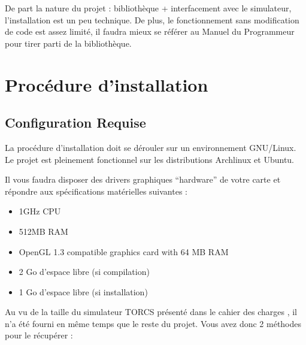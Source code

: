 \documentclass[a4paper,12pt]{article}
\begin{document}
  \begin{titlepage}
   \def\titletype{Manuel de l’utilisateur}
   
  \end{titlepage}

  
  \clearpage

  \tableofcontents
  

  \clearpage
  
  \renewcommand{\labelitemi}{$\bullet$}
  \renewcommand{\labelitemii}{$\circ$}
  \renewcommand{\labelitemiii}{$\diamond$}
  \renewcommand{\labelitemiv}{$\ast$}
  
  
  De part la nature du projet : bibliothèque + interfacement avec le simulateur, l'installation est un peu technique.
  De plus, le fonctionnement sans modification de code est assez limité, il faudra mieux se référer au 
  Manuel du Programmeur pour tirer parti de la bibliothèque.
  
  \section{Procédure d’installation}

  \subsection{Configuration Requise}
  La procédure d'installation doit se dérouler sur un environnement GNU/Linux.
  Le projet est pleinement fonctionnel sur les distributions Archlinux et Ubuntu.
 
  Il vous faudra disposer des drivers graphiques ``hardware'' de votre carte et répondre aux spécifications
  matérielles suivantes :
   \begin{itemize}
    \item 1GHz CPU
    \item 512MB RAM
    \item OpenGL 1.3 compatible graphics card with 64 MB RAM
    \item 2 Go d'espace libre (si compilation)
    \item 1 Go d'espace libre (si installation)
   \end{itemize}
 
 Au vu de la taille du simulateur TORCS \cite{TORCS} présenté
  dans le cahier des charges \cite{CdC}, il n'a été fourni en même temps que le reste du projet.
 Vous avez donc 2 méthodes pour le récupérer : 
\end{document}

